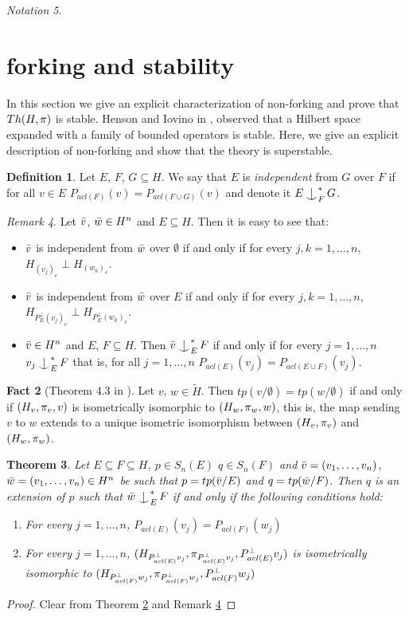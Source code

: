 \documentclass{amsart}
\def\bitm{\begin{itemize}}\def\eitm{\end{itemize}}
\newtheorem{theo}{Theorem}[section]
\theoremstyle{definition}
\newtheorem{defin}[theo]{Definition}
\newtheorem{fact}[theo]{Fact}
\theoremstyle{remark}
\newtheorem{rem}[theo]{Remark}
\newtheorem{nota}[theo]{Notation}
\begin{document}
\begin{nota}
\section{forking and stability}\label{Forking}
In this section we give an explicit characterization of non-forking and prove that $Th(H,\pi)$ is stable. Henson and Iovino in \cite{Io}, observed that a Hilbert space expanded with a family of bounded operators is stable. Here, we give an explicit description of non-forking and show that the theory is superstable.

\begin{defin}\label{AindependentB}
Let $E$, $F$, $G\subseteq H$. We say that $E$ is \textit{independent} from $G$ over $F$ if for all $v\in E$ $P_{acl(F)}(v)=P_{acl(F\cup G)}(v)$ and denote it $E\ind^*_F G$.
\end{defin}

\begin{rem}\label{independenceoverempty}\label{independenceoverA}\label{RemarkItIsEnoughIndependenceForOneVector}
Let $\bar v$, $\bar w\in H^n$ and $E\subseteq H$. Then it is easy to see that:
\bitm
\item $\bar v$ is independent from $\bar w$ over $\emptyset$ if and only if for every $j,k=1,\dots,n$, $H_{(v_j)_e}\perp H_{(w_k)_e}$.
\item $\bar v$ is independent from $\bar w$ over $E$ if and only if for every $j,k=1,\dots,n$, $H_{P_E^\perp(v_j)_e}\perp H_{P_E^\perp(w_k)_e}$.
\item $\bar v\in H^n$ and $E$, $F\subseteq H$. Then $\bv\ind^*_EF$ if and only if for every $j=1,\dots,n$ $v_j\ind^*_EF$ that is, for all $j=1,\dots,n$ $P_{acl(E)}(v_j)=P_{acl(E\cup F)}(v_j)$.
\eitm
\erm

\begin{fact}[Theorem 4.3 in \cite{Ar}]\label{typeoverempty1}
Let $v$, $w\in\tilde{H}$. Then $tp(v/\emptyset)=tp(w/\emptyset)$ if and only if $(H_v,\pi_v,v)$ is isometrically isomorphic to $(H_w,\pi_w,w)$, this is, the map sending $v$ to $w$ extends to a unique isometric isomorphism between $(H_v,\pi_v)$ and $(H_w,\pi_w)$.
\end{fact}

\begin{theo}\label{nonforkingextension}
Let $E\subseteq F\subseteq H$, $p\in S_n(E)$ $q\in S_n(F)$ and $\bar v=(v_1,\dots,v_n)$, $\bar w=(v_1,\dots,v_n)\in H^n$ be such that $p=tp(\bar v/E)$ and $q=tp(\bar w/F)$. Then $q$ is an extension of $p$ such that $\bw\ind^*_EF$ if and only if the following conditions hold:
    \begin{enumerate}
        \item For every $j=1,\dots,n$, $P_{acl(E)}(v_j)=P_{acl(F)}(w_j)$
        \item For every $j=1,\dots,n$, $(H_{P^\perp_{acl(E)}v_j},\pi_{P^\perp_{acl(E)}v_j},P^\perp_{acl(E)}v_j)$ is isometrically isomorphic to $(H_{P^\perp_{acl(F)}w_j},\pi_{P^\perp_{acl(F)}w_j},P^\perp_{acl(F)}w_j)$
    \end{enumerate}
\end{theo}
\begin{proof}
Clear from Theorem \ref{typeoverempty1} and Remark \ref{independenceoverempty}
\end{proof}


\end{rem}
\end{nota}
\end{document}
